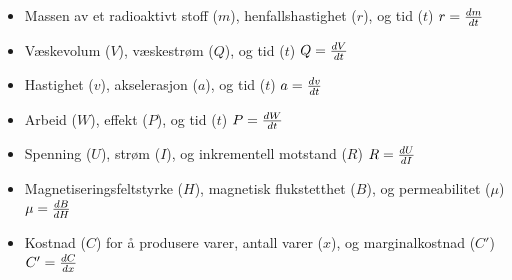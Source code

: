 
\begin{itemize}
\item{} Massen av et radioaktivt stoff ($m$), henfallshastighet ($r$), og tid ($t$) \hskip 30pt $r = {dm \over dt}$
\vskip 10pt 
\item{} Væskevolum ($V$), væskestrøm ($Q$), og tid ($t$) \hskip 30pt $Q = {dV \over dt}$
\vskip 10pt 
\item{} Hastighet ($v$), akselerasjon ($a$), og tid ($t$) \hskip 30pt $a = {dv \over dt}$
\vskip 10pt 
\item{} Arbeid ($W$), effekt ($P$), og tid ($t$) \hskip 30pt $P = {dW \over dt}$
\vskip 10pt 
\item{} Spenning ($U$), strøm ($I$), og inkrementell motstand ($R$) \hskip 30pt $R = {dU \over dI}$
\vskip 10pt 
\item{} Magnetiseringsfeltstyrke ($H$), magnetisk flukstetthet ($B$), og permeabilitet ($\mu$) \hskip 30pt $\mu = {dB \over dH}$
\vskip 10pt 
\item{} Kostnad ($C$) for å produsere varer, antall varer ($x$), og marginalkostnad ($C'$) \hskip 30pt $C' = {dC \over dx}$
\end{itemize}












